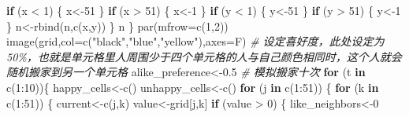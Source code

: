 \documentclass[]{tufte-book}
\newenvironment{Shaded}{}{}
\newcommand{\AttributeTok}[1]{\textcolor[rgb]{0.49,0.56,0.16}{#1}}
\newcommand{\CommentTok}[1]{\textcolor[rgb]{0.38,0.63,0.69}{\textit{#1}}}
\newcommand{\ControlFlowTok}[1]{\textcolor[rgb]{0.00,0.44,0.13}{\textbf{#1}}}
\newcommand{\DecValTok}[1]{\textcolor[rgb]{0.25,0.63,0.44}{#1}}
\newcommand{\FloatTok}[1]{\textcolor[rgb]{0.25,0.63,0.44}{#1}}
\newcommand{\FunctionTok}[1]{\textcolor[rgb]{0.02,0.16,0.49}{#1}}
\newcommand{\NormalTok}[1]{#1}
\newcommand{\OtherTok}[1]{\textcolor[rgb]{0.00,0.44,0.13}{#1}}
\newcommand{\SpecialCharTok}[1]{\textcolor[rgb]{0.25,0.44,0.63}{#1}}
\newcommand{\StringTok}[1]{\textcolor[rgb]{0.25,0.44,0.63}{#1}}
\begin{document}
\begin{Shaded}
\begin{Highlighting}[]
                \ControlFlowTok{if}\NormalTok{ (x }\SpecialCharTok{\textless{}} \DecValTok{1}\NormalTok{) \{}
\NormalTok{                        x}\OtherTok{\textless{}{-}}\DecValTok{51}
\NormalTok{                \}}
                \ControlFlowTok{if}\NormalTok{ (x }\SpecialCharTok{\textgreater{}} \DecValTok{51}\NormalTok{) \{}
\NormalTok{                        x}\OtherTok{\textless{}{-}}\DecValTok{1}
\NormalTok{                \}}
                \ControlFlowTok{if}\NormalTok{ (y }\SpecialCharTok{\textless{}} \DecValTok{1}\NormalTok{) \{}
\NormalTok{                        y}\OtherTok{\textless{}{-}}\DecValTok{51}
\NormalTok{                \}}
                \ControlFlowTok{if}\NormalTok{ (y }\SpecialCharTok{\textgreater{}} \DecValTok{51}\NormalTok{) \{}
\NormalTok{                        y}\OtherTok{\textless{}{-}}\DecValTok{1}
\NormalTok{                \}}
\NormalTok{                n}\OtherTok{\textless{}{-}}\FunctionTok{rbind}\NormalTok{(n,}\FunctionTok{c}\NormalTok{(x,y))}
\NormalTok{        \}}
\NormalTok{        n}
\NormalTok{\}}
\FunctionTok{par}\NormalTok{(}\AttributeTok{mfrow=}\FunctionTok{c}\NormalTok{(}\DecValTok{1}\NormalTok{,}\DecValTok{2}\NormalTok{))}
\FunctionTok{image}\NormalTok{(grid,}\AttributeTok{col=}\FunctionTok{c}\NormalTok{(}\StringTok{"black"}\NormalTok{,}\StringTok{"blue"}\NormalTok{,}\StringTok{"yellow"}\NormalTok{),}\AttributeTok{axes=}\NormalTok{F)}
\CommentTok{\# 设定喜好度，此处设定为50\%，也就是单元格里人周围少于四个单元格的人与自己颜色相同时，这个人就会随机搬家到另一个单元格}
\NormalTok{alike\_preference}\OtherTok{\textless{}{-}}\FloatTok{0.5}
\CommentTok{\# 模拟搬家十次}
\ControlFlowTok{for}\NormalTok{ (t }\ControlFlowTok{in} \FunctionTok{c}\NormalTok{(}\DecValTok{1}\SpecialCharTok{:}\DecValTok{10}\NormalTok{))\{}
\NormalTok{        happy\_cells}\OtherTok{\textless{}{-}}\FunctionTok{c}\NormalTok{()}
\NormalTok{        unhappy\_cells}\OtherTok{\textless{}{-}}\FunctionTok{c}\NormalTok{()}
        \ControlFlowTok{for}\NormalTok{ (j }\ControlFlowTok{in} \FunctionTok{c}\NormalTok{(}\DecValTok{1}\SpecialCharTok{:}\DecValTok{51}\NormalTok{)) \{}
                \ControlFlowTok{for}\NormalTok{ (k }\ControlFlowTok{in} \FunctionTok{c}\NormalTok{(}\DecValTok{1}\SpecialCharTok{:}\DecValTok{51}\NormalTok{)) \{}
\NormalTok{                        current}\OtherTok{\textless{}{-}}\FunctionTok{c}\NormalTok{(j,k)}
\NormalTok{                        value}\OtherTok{\textless{}{-}}\NormalTok{grid[j,k] }
                        \ControlFlowTok{if}\NormalTok{ (value }\SpecialCharTok{\textgreater{}} \DecValTok{0}\NormalTok{) \{}
\NormalTok{                                like\_neighbors}\OtherTok{\textless{}{-}}\DecValTok{0}

\end{Highlighting}
\end{Shaded}
\end{document}
